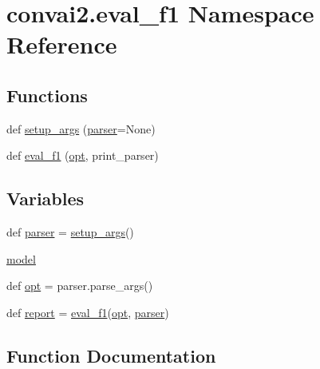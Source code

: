 \hypertarget{namespaceconvai2_1_1eval__f1}{}\section{convai2.\+eval\+\_\+f1 Namespace Reference}
\label{namespaceconvai2_1_1eval__f1}
\subsection*{Functions}
\begin{DoxyCompactItemize}
\item 
def \hyperlink{namespaceconvai2_1_1eval__f1_a90b87f9d08b7f7d3553d8c5755655304}{setup\+\_\+args} (\hyperlink{namespaceconvai2_1_1eval__f1_aeaae38a7efddce95c973c6c07f684b24}{parser}=None)
\item 
def \hyperlink{namespaceconvai2_1_1eval__f1_afe542e92a9299437c24ee9d9004ecf0a}{eval\+\_\+f1} (\hyperlink{namespaceconvai2_1_1eval__f1_aba7ce275c4164636cfb6e4cd9a6ea52b}{opt}, print\+\_\+parser)
\end{DoxyCompactItemize}
\subsection*{Variables}
\begin{DoxyCompactItemize}
\item 
def \hyperlink{namespaceconvai2_1_1eval__f1_aeaae38a7efddce95c973c6c07f684b24}{parser} = \hyperlink{namespaceconvai2_1_1eval__f1_a90b87f9d08b7f7d3553d8c5755655304}{setup\+\_\+args}()
\item 
\hyperlink{namespaceconvai2_1_1eval__f1_af34b27dd5af3525f16ee4221c35a95c2}{model}
\item 
def \hyperlink{namespaceconvai2_1_1eval__f1_aba7ce275c4164636cfb6e4cd9a6ea52b}{opt} = parser.\+parse\+\_\+args()
\item 
def \hyperlink{namespaceconvai2_1_1eval__f1_a1cc891377bdd32b8efa81d94c0d87a55}{report} = \hyperlink{namespaceconvai2_1_1eval__f1_afe542e92a9299437c24ee9d9004ecf0a}{eval\+\_\+f1}(\hyperlink{namespaceconvai2_1_1eval__f1_aba7ce275c4164636cfb6e4cd9a6ea52b}{opt}, \hyperlink{namespaceconvai2_1_1eval__f1_aeaae38a7efddce95c973c6c07f684b24}{parser})
\end{DoxyCompactItemize}


\subsection{Function Documentation}
\mbox{\label{namespaceconvai2_1_1eval__f1_afe542e92a9299437c24ee9d9004ecf0a}} 
